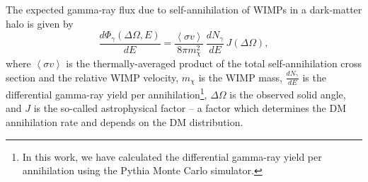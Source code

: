 \documentclass[12pt,manuscript]{aastex}
\newcommand{\expval}[1]{\left\langle #1 \right\rangle}
\begin{document}
The expected gamma-ray flux due to self-annihilation of WIMPs in a
dark-matter halo is given by \citep{2004PhRvD..69l3501E,2008ApJ...678..594W,2010ApJ...720.1174A}
\begin{equation}
\frac{d\Phi_{\gamma}(\Delta\Omega,E)}{dE}=
\frac{\expval{\sigma v}}{8\pi m_{\chi}^{2}}\,\frac{dN_{\gamma}}{dE}\, J(\Delta\Omega),
\label{eqn:WIMPflux}
\end{equation}
where $\expval{\sigma v}$ is the thermally-averaged product of the total self-annihilation cross
section and the relative WIMP velocity, $m_{\chi}$ is the WIMP mass, $\frac{dN_{\gamma}}{dE}$ is the
differential gamma-ray yield per annihilation\footnote{In this work, we have calculated the
differential gamma-ray yield per annihilation using the Pythia Monte Carlo simulator.},
$\Delta\Omega$ is the observed solid angle, and $J$ is the so-called
astrophysical factor -- a 
factor which determines the DM annihilation rate and depends on the DM distribution.
\end{document}
